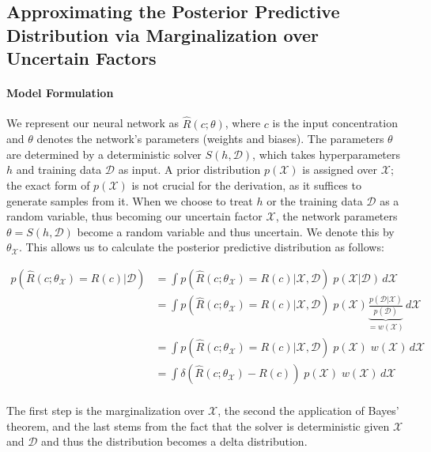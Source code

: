 \subsection{Approximating the Posterior Predictive Distribution via Marginalization over Uncertain Factors}

\paragraph{Model Formulation}

We represent our neural network as $\hat{R}(c; \theta)$, where $c$ is the input concentration and $\theta$ denotes the network's parameters (weights and biases). The parameters $\theta$ are determined by a deterministic solver $S(h, \mathcal{D})$, which takes hyperparameters $h$ and training data $\mathcal{D}$ as input. A prior distribution $p(\mathcal{X})$ is assigned over $\mathcal{X}$; the exact form of $p(\mathcal{X})$ is not crucial for the derivation, as it suffices to generate samples from it.
When we choose to treat $h$ or the training data $\mathcal{D}$ as a random variable, thus becoming our uncertain factor $\mathcal{X}$, the network parameters $\theta = S(h, \mathcal{D})$ become a random variable and thus uncertain. We denote this by $\theta_{\mathcal{X}}$. This allows us to calculate the posterior predictive distribution as follows:

\begin{align*}
p(\hat{R}(c; \theta_{\mathcal{X}}) = R(c)| \mathcal{D}) &= \int p(\hat{R}(c; \theta_{\mathcal{X}}) = R(c) | \mathcal{X}, \mathcal{D})\; p(\mathcal{X} | \mathcal{D}) \, d\mathcal{X} \\
                                          &= \int p(\hat{R}(c; \theta_{\mathcal{X}}) = R(c) | \mathcal{X}, \mathcal{D})\; p(\mathcal{X}) \underbrace{\frac{p(\mathcal{D} | \mathcal{X}) }{p(\mathcal{D})}}_{= w(\mathcal{X})} \, d\mathcal{X} \\
                                          &= \int p(\hat{R}(c; \theta_{\mathcal{X}}) = R(c) | \mathcal{X}, \mathcal{D})\; p(\mathcal{X})\; w(\mathcal{X}) \, d\mathcal{X} \\
                                          &= \int \delta(\hat{R}(c; \theta_{\mathcal{X}}) - R(c))\; p(\mathcal{X})\; w(\mathcal{X}) \, d\mathcal{X} \\
\end{align*}

The first step is the marginalization over $\mathcal{X}$, the second the application of Bayes' theorem, and the last stems from the fact that the solver is deterministic given $\mathcal{X}$ and $\mathcal{D}$ and thus the distribution becomes a delta distribution.


